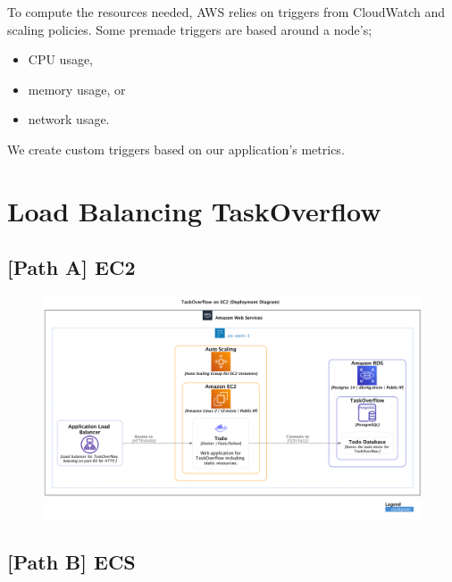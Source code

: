 \documentclass{csse4400}
\begin{document}
To compute the resources needed, AWS relies on triggers from CloudWatch and scaling policies.
Some premade triggers are based around a node's;

\begin{itemize}
    \item CPU usage,
    \item memory usage, or 
    \item network usage.
\end{itemize}

We create custom triggers based on our application's metrics.

\section{Load Balancing TaskOverflow}

\subsection{[Path A] EC2}

\begin{figure}[H]
  \includegraphics[width=\textwidth]{diagrams/ec2deployment}
\end{figure}








\subsection{[Path B] ECS}
\end{document}
